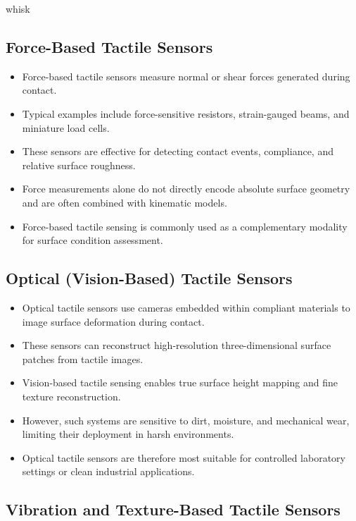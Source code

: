 whisk\documentclass[11pt,a4paper]{article}
\begin{document}
\subsection{Force-Based Tactile Sensors}

\begin{itemize}
    \item Force-based tactile sensors measure normal or shear forces generated during contact.
    \item Typical examples include force-sensitive resistors, strain-gauged beams, and miniature load cells.
    \item These sensors are effective for detecting contact events, compliance, and relative surface roughness.
    \item Force measurements alone do not directly encode absolute surface geometry and are often combined with kinematic models.
    \item Force-based tactile sensing is commonly used as a complementary modality for surface condition assessment.
\end{itemize}

\subsection{Optical (Vision-Based) Tactile Sensors}

\begin{itemize}
    \item Optical tactile sensors use cameras embedded within compliant materials to image surface deformation during contact.
    \item These sensors can reconstruct high-resolution three-dimensional surface patches from tactile images.
    \item Vision-based tactile sensing enables true surface height mapping and fine texture reconstruction.
    \item However, such systems are sensitive to dirt, moisture, and mechanical wear, limiting their deployment in harsh environments.
    \item Optical tactile sensors are therefore most suitable for controlled laboratory settings or clean industrial applications.
\end{itemize}

\subsection{Vibration and Texture-Based Tactile Sensors}
\end{document}
